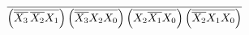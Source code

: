 \documentclass[preview]{standalone}
\begin{document}
\begin{align*}
\overline{\left(\overline{\overline{X_3}\nobreak\hspace{.16667em plus .08333em}\overline{X_2}X_1}\right)\left(\overline{\overline{X_3}X_2X_0}\right)\left(\overline{X_2\overline{X_1}X_0}\right)\left(\overline{\overline{X_2}X_1X_0}\right)}
\end{align*}
\end{document}
